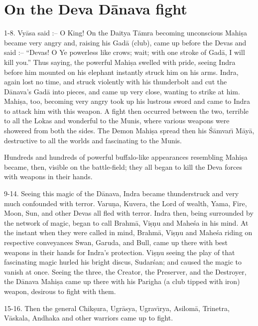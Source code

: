 \chapter{On the Deva D\=anava fight}

1-8. Vy\=asa said :-- O King! On the Daitya T\=amra becoming unconscious Mahi\d{s}a became very angry and, raising his Gad\=a (club), came up before the Devas and said :-- ``Devas! O Ye powerless like crows; wait; with one stroke of Gad\=a, I will kill you.'' Thus saying, the powerful Mahi\d{s}a swelled with pride, seeing Indra before him mounted on his elephant instantly struck him on his arms. Indra, again lost no time, and struck violently with his thunderbolt and cut the D\=anava's Gad\=a into pieces, and came up very close, wanting to strike at him. Mahi\d{s}a, too, becoming very angry took up his lustrous sword and came to Indra to attack him with this weapon. A fight then occurred between the two, terrible to all the Lokas and wonderful to the Munis, where various weapons were showered from both the sides. The Demon Mahi\d{s}a spread then his \'S\=amvar\={\i} M\=ay\=a, destructive to all the worlds and fascinating to the Munis.

Hundreds and hundreds of powerful buffalo-like appearances resembling Mahi\d{s}a became, then, visible on the battle-field; they all began to kill the Deva forces with weapons in their hands.

9-14. Seeing this magic of the D\=anava, Indra became thunderstruck and very much confounded with terror. Varu\d{n}a, Kuvera, the Lord of wealth, Yama, Fire, Moon, Sun, and other Devas all fled with terror. Indra then, being surrounded by the network of magic, began to call Brahm\=a, Vi\d{s}\d{n}u and Mahe\'sa in his mind. At the instant when they were called in mind, Brahm\=a, Vi\d{s}\d{n}u and Mahe\'sa riding on respective conveyances Swan, Garuda, and Bull, came up there with best weapons in their hands for Indra's protection. Vi\d{s}\d{n}u seeing the play of that fascinating magic hurled his bright discus, Sudar\'san; and caused the magic to vanish at once. Seeing the three, the Creator, the Preserver, and the Destroyer, the D\=anava Mahi\d{s}a came up there with his Parigha (a club tipped with iron) weapon, desirous to fight with them.

15-16. Then the general Chik\d{s}ura, Ugr\=asya, Ugrav\={\i}rya, Asilom\=a, Trinetra, V\=askala, Andhaka and other warriors came up to fight.

